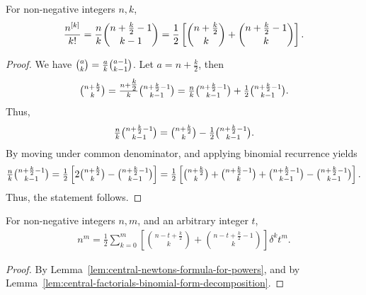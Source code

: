 \begin{lemma}
  \label{lem:central-factorials-binomial-form-decomposition}
  For  non-negative integers $n,k$,
  \begin{align*}
    \frac{n^{[k]}}{k!}
    = \frac{n}{k} \binom{n+\frac{k}{2}-1}{k-1}
    = \frac{1}{2}
    \left[ \binom{n+\frac{k}{2}}{k} + \binom{n+\frac{k}{2}-1}{k} \right].
  \end{align*}
  \begin{proof}
    We have $\tbinom{a}{k} = \frac{a}{k} \tbinom{a-1}{k-1}$.
    Let $a=n + \frac{k}{2}$, then
    \begin{align*}
      \tbinom{n + \frac{k}{2}}{k} = \tfrac{n + \tfrac{k}{2}}{k} \tbinom{n+\frac{k}{2}-1}{k-1}
      = \tfrac{n}{k} \tbinom{n+\frac{k}{2}-1}{k-1} + \tfrac{1}{2} \tbinom{n+\frac{k}{2}-1}{k-1}.
    \end{align*}
    Thus,
    \begin{align*}
      \tfrac{n}{k} \tbinom{n+\frac{k}{2}-1}{k-1} = \tbinom{n + \frac{k}{2}}{k} - \tfrac{1}{2} \tbinom{n+\frac{k}{2}-1}{k-1}.
    \end{align*}
    By moving under common denominator, and applying binomial recurrence yields
    \begin{align*}
      \tfrac{n}{k} \tbinom{n+\frac{k}{2}-1}{k-1}
      = \tfrac{1}{2}
      \left[
        2 \tbinom{n + \frac{k}{2}}{k} - \tbinom{n+\frac{k}{2}-1}{k-1}
      \right]
      = \tfrac{1}{2}
      \left[
        \tbinom{n + \frac{k}{2}}{k} + \tbinom{n + \frac{k}{2}-1}{k} + \tbinom{n + \frac{k}{2}-1}{k-1} - \tbinom{n+\frac{k}{2}-1}{k-1}
      \right].
    \end{align*}
    Thus, the statement follows.
  \end{proof}
\end{lemma}

\begin{lemma}
  \label{lem:central-newtons-formula-for-powers-decomposition}
  For non-negative integers $n,m$, and an arbitrary integer $t$,
  \begin{align*}
    n^m = \frac{1}{2} \sum_{k=0}^{m}
    \left[
      \binom{n-t+\frac{k}{2}}{k} + \binom{n-t+\frac{k}{2}-1}{k}
    \right] \delta^{k} t^m.
  \end{align*}
  \begin{proof}
    By Lemma~\eqref{lem:central-newtons-formula-for-powers}, and
    by Lemma~\eqref{lem:central-factorials-binomial-form-decomposition}.
  \end{proof}
\end{lemma}

